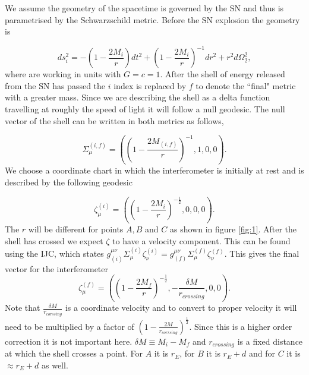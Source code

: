 \documentclass[aps,showpacs,twocolumn,floats,prd,superscriptaddress,nofootinbib]{revtex4-1}
\begin{document}
We assume the geometry of the spacetime is governed by the SN and thus is parametrised by the Schwarzschild metric. Before the SN explosion the geometry is

\begin{equation}
	ds^2_i = - \left( 1 - \frac{2M_i}{r} \right) dt^2 + \left( 1 - \frac{2M_i}{r} \right)^{-1} dr^2 + r^2 d \Omega_2^2,
\end{equation}
where are working in units with $G = c =1$. After the shell of energy released from the SN has passed the $i$ index is replaced by $f$ to denote the ``final" metric with a greater mass. Since we are describing the shell as a delta function travelling at roughly the speed of light it will follow a null geodesic. The null vector of the shell can be written in both metrics as follows,

\begin{equation}
	\Sigma_\mu^{(i,f)} = \left( \left( 1 - \frac{2M_{(i,f)}}{r} \right)^{-1}, 1, 0, 0 \right).
\end{equation}
We choose a coordinate chart in which the interferometer is initially at rest and is described by the following geodesic

\begin{equation}
	\zeta_\mu^{(i)} = \left( \left( 1 - \frac{2M_i}{r} \right)^{-\frac{1}{2}}, 0, 0, 0 \right).
\end{equation}
The $r$ will be different for points $A,B$ and $C$ as shown in figure \ref{fig:1}. After the shell has crossed we expect $\zeta$ to have a velocity component. This can be found using the IJC, which states $g^{\mu \nu}_{(i)} \Sigma_\mu^{(i)} \zeta^{(i)}_\nu = g^{\mu \nu}_{(f)} \Sigma_\mu^{(f)} \zeta^{(f)}_\nu$. This gives the final vector for the interferometer
\begin{equation}
	\zeta_\mu^{(f)} = \left( \left( 1 - \frac{2M_f}{r} \right)^{-\frac{1}{2}}, - \frac{\delta M}{r_{crossing}}, 0, 0 \right).
\end{equation}
Note that $\frac{\delta M}{r_{corssing}}$ is a coordinate velocity and to convert to proper velocity it will need to be multiplied by a factor of $\left( 1 - \frac{2M}{r_{corrsing}} \right)^\frac{1}{2}$. Since this is a higher order correction it is not important here. $\delta M \equiv M_i - M_f$ and $r_{crossing}$ is a fixed distance at which the shell crosses a point. For $A$ it is $r_E$, for $B$ it is $r_E + d$ and for $C$ it is $\approx r_E + d$ as well.
\end{document}
